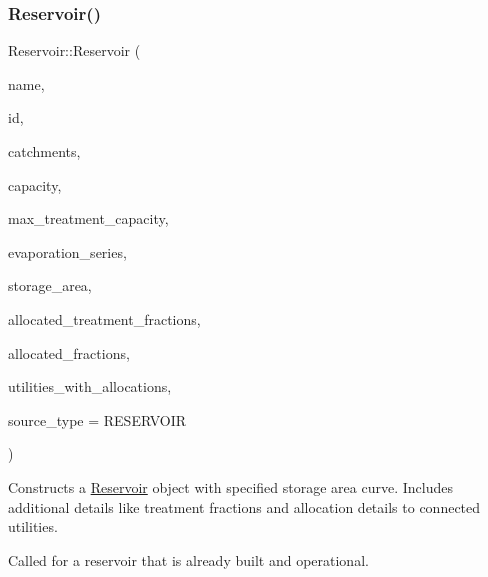 \subsubsection{\texorpdfstring{Reservoir()}{Reservoir()}\hspace{0.1cm}{\footnotesize\ttfamily [6/9]}}
{\footnotesize\ttfamily Reservoir\+::\+Reservoir (\begin{DoxyParamCaption}\item[{const char $\ast$}]{name,  }\item[{const int}]{id,  }\item[{const vector$<$ \mbox{\hyperlink{classCatchment}{Catchment}} $\ast$$>$ \&}]{catchments,  }\item[{const double}]{capacity,  }\item[{const double}]{max\+\_\+treatment\+\_\+capacity,  }\item[{Evaporation\+Series \&}]{evaporation\+\_\+series,  }\item[{double}]{storage\+\_\+area,  }\item[{vector$<$ double $>$ $\ast$}]{allocated\+\_\+treatment\+\_\+fractions,  }\item[{vector$<$ double $>$ $\ast$}]{allocated\+\_\+fractions,  }\item[{vector$<$ int $>$ $\ast$}]{utilities\+\_\+with\+\_\+allocations,  }\item[{int}]{source\+\_\+type = {\ttfamily RESERVOIR} }\end{DoxyParamCaption})}



Constructs a \mbox{\hyperlink{classReservoir}{Reservoir}} object with specified storage area curve. Includes additional details like treatment fractions and allocation details to connected utilities. 

Called for a reservoir that is already built and operational.


